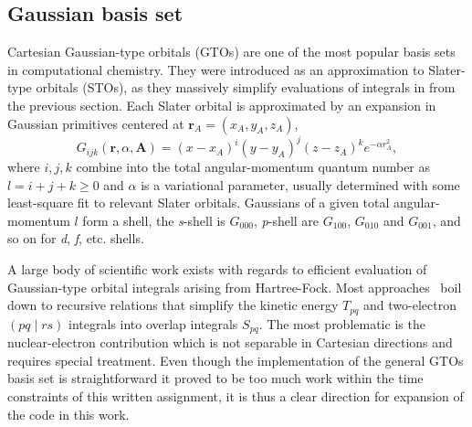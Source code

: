 \documentclass[final,3p,times,twocolumn]{elsarticle}
\begin{document}
	\subsection{Gaussian basis set}
	Cartesian Gaussian-type orbitals (GTOs) are one of the most popular basis sets in computational chemistry. They were introduced as an approximation to Slater-type orbitals (STOs), as they massively simplify evaluations of integrals in from the previous section. Each Slater orbital is approximated by an expansion in Gaussian primitives centered at $\mathbf{r}_A = (x_A, y_A, z_A)$, 
	\begin{equation}
		G_{i j k}(\mathbf{r}, \alpha, \mathbf{A})=(x-x_{A})^{i} (y-y_{A})^{j} (z-z_{A})^{k} e^{-\alpha r_{A}^{2}},
	\end{equation}
	where $i,j,k$ combine into the total angular-momentum quantum number as $l = i+j+k \geq 0$ and $\alpha$ is a variational parameter, usually determined with some least-square fit to relevant Slater orbitals. Gaussians of a given total angular-momentum $l$ form a shell, the \emph{s}-shell is $G_{000}$, \emph{p}-shell are $G_{100}$, $G_{010}$ and $G_{001}$, and so on for \emph{d}, \emph{f}, etc. shells. 
	
	A large body of scientific work exists with regards to efficient evaluation of Gaussian-type orbital integrals arising from Hartree-Fock. Most approaches~\cite{mcmurchie1978one, obara1986efficient} boil down to recursive relations that simplify the kinetic energy $T_{pq}$ and two-electron $(p q \mid r s)$ integrals into overlap integrals $S_{pq}$. The most problematic is the nuclear-electron contribution which is not separable in Cartesian directions and requires special treatment. Even though the implementation of the general GTOs basis set is straightforward it proved to be too much work within the time constraints of this written assignment, it is thus a clear direction for expansion of the code in this work. 
\end{document}
